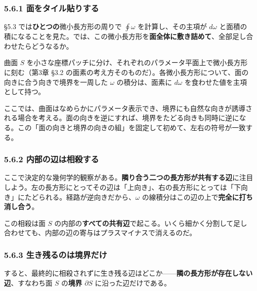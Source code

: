 \documentclass[a4paper,12pt,openany]{book}
\begin{document}
\hypertarget{ux9762ux3092ux30bfux30a4ux30ebux8cbcux308aux3059ux308b}{%
\subsubsection{5.6.1
面をタイル貼りする}\label{ux9762ux3092ux30bfux30a4ux30ebux8cbcux308aux3059ux308b}}

§5.3 では\textbf{ひとつの}微小長方形の周りで \(\oint \omega\)
を計算し、その主項が \(d\omega\)
と面積の積になることを見た。では、この微小長方形を\textbf{面全体に敷き詰めて}、全部足し合わせたらどうなるか。

曲面 \(S\)
を小さな座標パッチに分け、それぞれのパラメータ平面上で微小長方形に刻む（第3章
§3.2
の面素の考え方そのものだ）。各微小長方形について、面の向きに合う向きで境界を一周した
\(\omega\) の積分は、面素に \(d\omega\) を食わせた値を主項として持つ。

ここでは、曲面はなめらかにパラメータ表示でき、境界にも自然な向きが誘導される場合を考える。面の向きを逆にすれば、境界をたどる向きも同時に逆になる。この「面の向きと境界の向きの組」を固定して初めて、左右の符号が一致する。

\hypertarget{ux5185ux90e8ux306eux8fbaux306fux76f8ux6bbaux3059ux308b}{%
\subsubsection{5.6.2
内部の辺は相殺する}\label{ux5185ux90e8ux306eux8fbaux306fux76f8ux6bbaux3059ux308b}}

ここで決定的な幾何学的観察がある。\textbf{隣り合う二つの長方形が共有する辺}に注目しよう。左の長方形にとってその辺は「上向き」、右の長方形にとっては「下向き」にたどられる。経路が逆向きだから、\(\omega\)
の線積分はこの辺の上で\textbf{完全に打ち消し合う}。

この相殺は面 \(S\)
の内部の\textbf{すべての共有辺}で起こる。いくら細かく分割して足し合わせても、内部の辺の寄与はプラスマイナスで消えるのだ。

\hypertarget{ux751fux304dux6b8bux308bux306eux306fux5883ux754cux3060ux3051}{%
\subsubsection{5.6.3
生き残るのは境界だけ}\label{ux751fux304dux6b8bux308bux306eux306fux5883ux754cux3060ux3051}}

すると、最終的に相殺されずに生き残る辺はどこか——\textbf{隣の長方形が存在しない辺}、すなわち面
\(S\) の\textbf{境界 $\partial S$} に沿った辺だけである。
\end{document}
